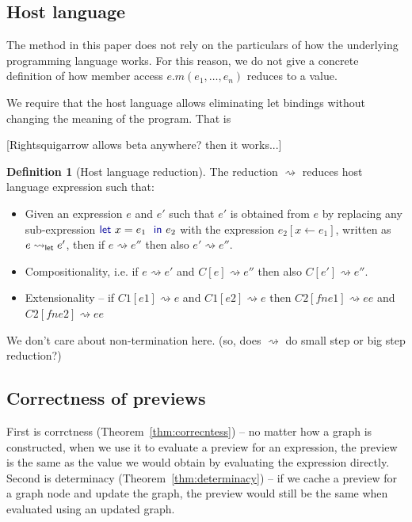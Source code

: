 \documentclass[sigplan,10pt]{acmart}\settopmatter{printfolios=true,printccs=false,printacmref=false}
\newcounter{dfc}
\theoremstyle{plain}
\theoremstyle{definition}
\newtheorem{definition}[dfc]{Definition}
\newcommand{\ident}[1]{\textnormal{\sffamily #1}}
\newcommand{\kvd}[1]{\textnormal{\textcolor{kvdclr}{\sffamily #1}}}
\begin{document}
\subsection{Host language}
The method in this paper does not rely on the particulars of how the underlying programming 
language works. For this reason, we do not give a concrete definition of how member access
$e.m(e_1,\ldots, e_n)$ reduces to a value.


We require that the host language allows eliminating let bindings without changing the meaning
of the program. That is

[Rightsquigarrow allows beta anywhere? then it works...]

\begin{definition}[Host language reduction]
The reduction $\rightsquigarrow$ reduces host language expression such that:
\begin{itemize}
\item  
Given an expression $e$ and $e'$ such that $e'$ is obtained from $e$
by replacing any sub-expression $\kvd{let}~x=e_1~\kvd{in}~e_2$ with the expression 
$e_2[x\leftarrow e_1]$, written as $e\rightsquigarrow_\ident{let}e'$, then if $e \rightsquigarrow e''$ then also $e' \rightsquigarrow e''$.

\item 
Compositionality, i.e. if $e \rightsquigarrow e'$ and $C[e] \rightsquigarrow e''$ then also
  $C[e'] \rightsquigarrow e''$.

\item
Extensionality -- if $C1[e1] \rightsquigarrow e$ and $C1[e2] \rightsquigarrow e$ then $C2[fn e1] \rightsquigarrow ee$ and $C2[fn e2] \rightsquigarrow ee$

\end{itemize}
\end{definition}



We don't care about non-termination here.
(so, does $\rightsquigarrow$ do small step or big step reduction?)

\subsection{Correctness of previews}
\label{sec:properties-correct}

First is corrctness (Theorem~\ref{thm:correcntess}) -- no matter how a graph is constructed, when 
we use it to evaluate a preview for an expression, the preview is the same as the value we would 
obtain by evaluating the expression directly. Second is determinacy (Theorem~\ref{thm:determinacy}) --
if we cache a preview for a graph node and update the graph, the preview would still be the same
when evaluated using an updated graph.
\end{document}
